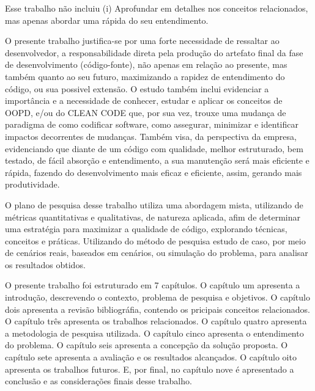 \documentclass[12pt]{article}
\begin{document}
Esse trabalho não incluiu
(i) Aprofundar em detalhes nos conceitos relacionados, mas apenas abordar uma rápida do seu entendimento.


O presente trabalho justifica-se por uma forte necessidade de ressaltar ao desenvolvedor, a responsabilidade direta pela produção do artefato final da fase de desenvolvimento (código-fonte)\cite{TR_CLEAN_CODE_IMPORTANCIA}, não apenas em relação ao presente, mas também quanto ao seu futuro, maximizando a rapidez de entendimento do código, ou sua possivel extensão. O estudo também inclui evidenciar a importância e a necessidade de conhecer, estudar e aplicar os conceitos de OOPD, e/ou do CLEAN CODE que, por sua vez, trouxe uma mudança de paradigma de como codificar software, como assegurar, minimizar e identificar impactos decorrentes de mudanças\cite{CODE_SIMPLICITY}.
Também visa, da perspectiva da empresa, evidenciando que diante de um código com qualidade, melhor estruturado, bem testado, de fácil absorção e entendimento, a sua manutenção será mais eficiente e rápida, fazendo do desenvolvimento mais eficaz e eficiente, assim, gerando mais produtividade.

O plano de pesquisa desse trabalho utiliza uma abordagem mista, utilizando de métricas quantitativas e qualitativas, de natureza aplicada, afim de determinar uma estratégia para maximizar a qualidade de código, explorando técnicas, conceitos e práticas. Utilizando do método de pesquisa estudo de caso, por meio de cenários reais, baseados em cenários, ou simulação do problema, para analisar os resultados obtidos.

O presente trabalho foi estruturado em 7 capítulos.
O capítulo um apresenta a introdução, descrevendo o contexto, problema de pesquisa e objetivos.
O capítulo dois apresenta a revisão bibliográfia, contendo os pricipais conceitos relacionados.
O capítulo três apresenta os trabalhos relacionados.
O capítulo quatro apresenta a metodologia de pesquisa utilizada.
O capítulo cinco apresenta o entendimento do problema.
O capítulo seis apresenta a concepção da solução proposta.
O capítulo sete apresenta a avaliação e os resultados alcançados.
O capítulo oito apresenta os trabalhos futuros.
E, por final, no capítulo nove é apresentado a conclusão e as considerações finais desse trabalho.
\end{document}
